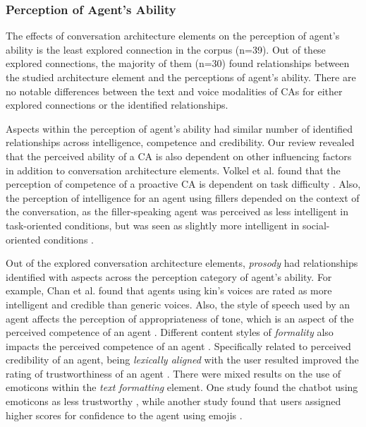 \subsubsection{Perception of Agent's Ability}

The effects of conversation architecture elements on the perception of agent's ability is the least explored connection in the corpus (n=39). Out of these explored connections, the majority of them (n=30) found relationships between the studied architecture element and the perceptions of agent's ability. There are no notable differences between the text and voice modalities of CAs for either explored connections or the identified relationships.

Aspects within the perception of agent's ability had similar number of identified relationships across intelligence, competence and credibility. Our review revealed that the perceived ability of a CA is also dependent on other influencing factors in addition to conversation architecture elements. Volkel et al. \cite{kraus2020effects}\cmt{[64]} found that the perception of competence of a proactive CA is dependent on task difficulty \cite{kraus2020effects}\cmt{[64]}. Also, the perception of intelligence for an agent using fillers depended on the context of the conversation, as the filler-speaking agent was perceived as less intelligent in task-oriented conditions, but was seen as slightly more intelligent in social-oriented conditions \cite{jeong2019exploring}\cmt{[10]}.

Out of the explored conversation architecture elements, \textit{prosody} had relationships identified with aspects across the perception category of agent's ability. For example, Chan et al. \cite{chan2021kinvoices}\cmt{[74]} found that agents using kin's voices are rated as more intelligent and credible than generic voices. Also, the style of speech used by an agent affects the perception of appropriateness of tone, which is an aspect of the perceived competence of an agent \cite{misu2011toward}\cmt{[83]}. Different content styles of \textit{formality} also impacts the perceived competence of an agent \cite{cox2022does, jestin2022effects}\cmt{[27][81]}. Specifically related to perceived credibility of an agent, being \textit{lexically aligned} with the user resulted improved the rating of trustworthiness of an agent \cite{hoegen2019end, linnemann2018can}\cmt{[31][15]}. There were mixed results on the use of emoticons within the \textit{text formatting} element. One study found the chatbot using emoticons as less trustworthy \cite{wilhelm2022keep}\cmt{[28]}, while another study found that users assigned higher scores for confidence to the agent using emojis \cite{fadhil2018effect}\cmt{[52]}. 

